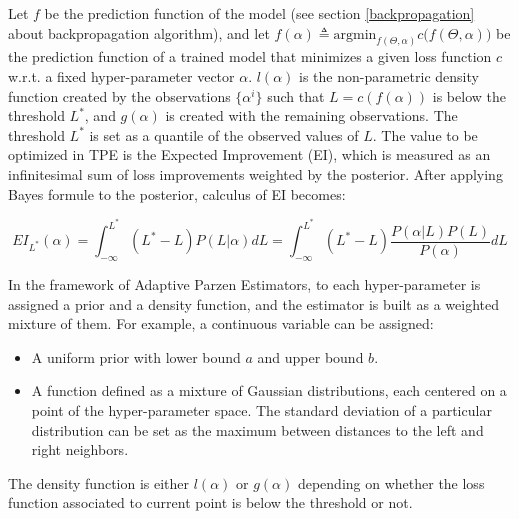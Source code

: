   Let $f$ be the prediction function of the model (see section \ref{backpropagation} about backpropagation algorithm),
  and let $f(\alpha) \triangleq \text{argmin}_{f(\Theta, \alpha)} c\big(f(\Theta, \alpha)\big)$ be the prediction function  %
  of a trained model that minimizes a given loss function $c$ w.r.t. a fixed hyper-parameter vector $\alpha$.  %
  $l(\alpha)$ is the non-parametric density function created by the observations $\{ \alpha^{i} \}$ such that
  $L = c(f(\alpha))$ is below the threshold $L^*$, and $g(\alpha)$ is created with the remaining observations.
  The threshold $L^*$ is set as a quantile of the observed values of $L$.
  The value to be optimized in TPE is the Expected Improvement (EI), which is measured as an infinitesimal sum  %
  of loss improvements weighted by the posterior. After applying Bayes formule to the posterior, calculus of EI becomes:

  \begin{equation}
    EI_{L^*}(\alpha) = \int_{-\infty}^{L^*} (L^* - L) P(L \vert \alpha) dL
    = \int_{-\infty}^{L^*} (L^* - L) \frac{P(\alpha \vert L) P(L)}{P(\alpha)} dL
  \end{equation}

  In the framework of Adaptive Parzen Estimators, to each hyper-parameter is assigned a prior and a density function,
  and the estimator is built as a weighted mixture of them.
  For example, a continuous variable can be assigned:
  \begin{itemize}
    \item A uniform prior with lower bound $a$ and upper bound $b$.
    \item A function defined as a mixture of Gaussian distributions, each centered on a point of the hyper-parameter
    space. The standard deviation of a particular distribution can be set as the maximum between distances to the left and right
    neighbors.
  \end{itemize}

  The density function is either $l(\alpha)$ or $g(\alpha)$ depending on whether the loss function associated to current
  point is below the threshold or not.

